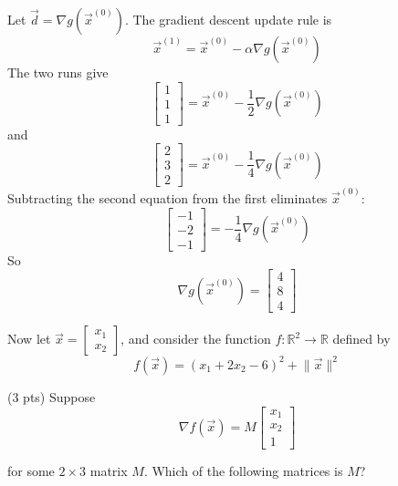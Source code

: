 \documentclass[11pt]{article}
\begin{document}
\begin{prob}
\begin{subprob}
\begin{solution}
Let $\vec d = \nabla g(\vec x^{(0)})$. The gradient descent update rule is
\[
\vec x^{(1)} = \vec x^{(0)} - \alpha \nabla g(\vec x^{(0)})
\]
The two runs give
\[
\begin{bmatrix}
1\\
1\\
1
\end{bmatrix}
=
\vec x^{(0)} - \frac{1}{2}\nabla g(\vec x^{(0)})
\]
and
\[
\begin{bmatrix}
2\\
3\\
2
\end{bmatrix}
=
\vec x^{(0)} - \frac{1}{4}\nabla g(\vec x^{(0)})
\]
Subtracting the second equation from the first eliminates $\vec x^{(0)}$:
\[
\begin{bmatrix}
-1\\
-2\\
-1
\end{bmatrix}
=
-\frac{1}{4}\nabla g(\vec x^{(0)})
\]
So
\[
\nabla g(\vec x^{(0)}) =
\boxed{
\begin{bmatrix}
4\\
8\\
4
\end{bmatrix}}
\]
\end{solution}
\end{subprob}

Now let $\vec x = \begin{bmatrix} x_1 \\ x_2 \end{bmatrix}$, and consider the function $f: \mathbb{R}^2 \to \mathbb{R}$ defined by
\[
f(\vec x) = (x_1 + 2x_2 - 6)^2 + \lVert \vec x \rVert^2
\]

\begin{subprob}(3 pts)
Suppose
\[
\nabla f(\vec x)
=
M
\begin{bmatrix}
x_1\\
x_2\\
1
\end{bmatrix}
\]

for some $2 \times 3$ matrix $M$. Which of the following matrices is $M$? \\


\end{subprob}
\end{prob}
\end{document}

